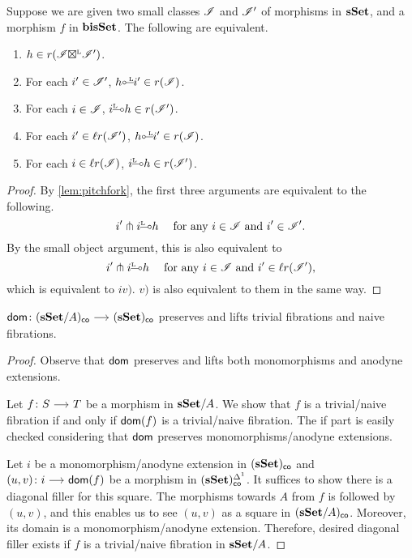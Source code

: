 \documentclass[a4paper,  dvipsnames, 11pt]{amsart}
\begin{document}
\begin{lemma}
	Suppose we are given two small classes $\mathscr{I}$ and $\mathscr{I}'$ of morphisms in $\mathbf{sSet}$, and a morphism $f$ in $\mathbf{bisSet}$.
	The following are equivalent.
	\begin{enumerate}
		\item %
			$h\in r(\mathscr{I}{\mathrel{\boxtimes^{\text{\tiny{L}}}}}\mathscr{I}')$.
		\item %
			For each $i'\in\mathscr{I}'$, $h\lollipopL i'\in r(\I)$.
		\item %
			For each $i\in\mathscr{I}$, $i\rollipopL h\in r(\I')$.
		\item %
			For each $i'\in\ell r(\mathscr{I}')$, $h\lollipopL i'\in r(\I)$.
		\item %
			For each $i\in\ell r(\mathscr{I})$, $i\rollipopL h\in r(\I')$.
	\end{enumerate}
\end{lemma}
\begin{proof}
	By \cref{lem:pitchfork}, the first three arguments are equivalent to the following.
	\[
		i' \pitchfork i\rollipopL h
		\hspace{3ex}
		\text{for any $i\in\I$ and $i'\in\I'$.}
	\]
	By the small object argument,
	this is also equivalent to
	\[
		i' \pitchfork i\rollipopL h
		\hspace{3ex}
		\text{for any $i\in\I$ and $i'\in\ell r(\I')$,}
	\]
	which is equivalent to $iv)$.
	$v)$ is also equivalent to them in the same way.
\end{proof}
\begin{lemma}
	$\dom\colon(\sSet/A)_\co\arr(\sSet)_\co$ preserves and lifts trivial fibrations and naive fibrations.
\end{lemma}
\begin{proof}
	Observe that $\mathsf{dom}$ preserves and lifts both monomorphisms and anodyne extensions.

	Let $f\colon S\arr T$ be a morphism in $\mathbf{sSet}/A$. We show that $f$ is a trivial/naive fibration if and only if $\mathsf{dom}(f)$ is a trivial/naive fibration.
	The if part is easily checked considering that $\mathsf{dom}$ preserves monomorphisms/anodyne extensions.

	Let $i$ be a monomorphism/anodyne extension in $(\mathbf{sSet})_{\mathsf{co}}$ and $(u,v)\colon i \arr \dom(f)$ be a morphism in $(\mathbf{sSet})_{\mathsf{co}}^{\Delta^1}$.
	It suffices to show there is a diagonal filler for this square. 
	The morphisms towards $A$ from $f$ is followed by $(u,v)$, and this enables us to see $(u,v)$ as a
	square in $(\mathbf{sSet}/A)_{\mathsf{co}}$. Moreover, its domain is a monomorphism/anodyne extension.
	Therefore, desired diagonal filler exists if $f$ is a trivial/naive fibration in $\mathbf{sSet}/A$.
\end{proof}
\end{document}
